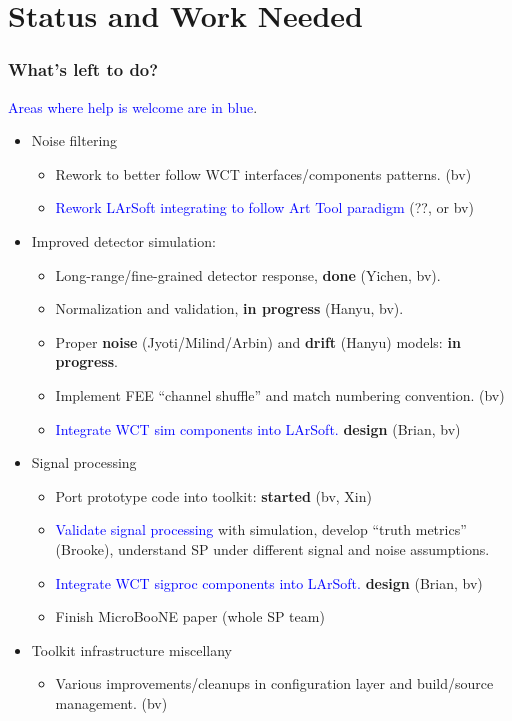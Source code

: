 \documentclass[xcolor=dvipsnames]{beamer}
\begin{document}
\section{Status and Work Needed}

\begin{frame}
\end{frame}

\begin{frame}
  \frametitle{What's left to do?}

  {\scriptsize \textcolor{blue}{Areas where help is welcome are in blue}. }    

  \begin{itemize}
  \item Noise filtering
    \begin{itemize}\scriptsize
    \item Rework to better follow WCT interfaces/components patterns. (bv)
    \item \textcolor{blue}{Rework LArSoft integrating to follow Art Tool paradigm} (??, or bv)
    \end{itemize}
  \item Improved detector simulation:
    \begin{itemize}\scriptsize
    \item Long-range/fine-grained detector response, \textbf{done} (Yichen, bv).
    \item Normalization and validation, \textbf{in progress} (Hanyu, bv).
    \item Proper \textbf{noise} (Jyoti/Milind/Arbin) and \textbf{drift} (Hanyu) models: \textbf{in progress}.
      
    \item Implement FEE ``channel shuffle'' and match numbering convention. (bv)
    \item \textcolor{blue}{Integrate WCT sim components into LArSoft.} \textbf{design} (Brian, bv)
    \end{itemize}
  \item Signal processing
    \begin{itemize}\scriptsize
    \item Port prototype code into toolkit: \textbf{started} (bv, Xin)
    \item \textcolor{blue}{Validate signal processing} with simulation, develop ``truth metrics'' (Brooke), understand SP under different signal and noise assumptions.
    \item \textcolor{blue}{Integrate WCT sigproc components into LArSoft.} \textbf{design} (Brian, bv)
    \item Finish MicroBooNE paper (whole SP team)
    \end{itemize}
  \item Toolkit infrastructure miscellany
    \begin{itemize}\scriptsize
    \item Various improvements/cleanups in configuration layer and
      build/source management. (bv)
    \end{itemize}
  \end{itemize}
\end{frame}
\end{document}
